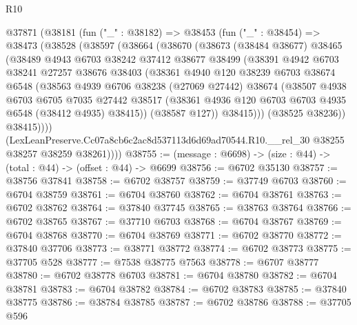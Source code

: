 \begin{lexlean}{R10}
\begin{coremodule}
  @37871
    (@38181
      (fun ("_" : @38182) =>
      @38453
        (fun ("_" : @38454) =>
        @38473
          (@38528
            (@38597
              (@38664
                (@38670
                  (@38673
                    (@38484 @38677)
                    @38465
                    (@38489
                      @4943
                      @6703
                      @38242
                      @37412
                      @38677
                      @38499
                      (@38391
                        @4942
                        @6703
                        @38241
                        @27257
                        @38676
                        @38403
                        (@38361
                          @4940
                          @120
                          @38239
                          @6703
                          @38674
                          @6548
                          (@38563
                            @4939
                            @6706
                            @38238
                            (@27069 @27442)
                            @38674
                            (@38507
                              @4938
                              @6703
                              @6705
                              @7035
                              @27442
                              @38517
                              (@38361 @4936 @120 @6703 @6703 @4935 @6548 (@38412 @4935) @38415))
                            (@38587 @127))
                          @38415)))
                    (@38525 @38236))
                  @38415))))
          (LexLeanPreserve.Cc07a8cb6c2ac8d537113d6d69ad70544.R10.__rel_30
            @38255
            @38257
            @38259
            @38261))))
@38755 := (message : @6698) -> (size : @44) -> (total : @44) -> (offset : @44) -> @6699
@38756 := @6702 @35130
@38757 := @38756 @37841
@38758 := @6702 @38757
@38759 := @37749 @6703
@38760 := @6704 @38759
@38761 := @6704 @38760
@38762 := @6704 @38761
@38763 := @6702 @38762
@38764 := @37840 @37745
@38765 := @38763 @38764
@38766 := @6702 @38765
@38767 := @37710 @6703
@38768 := @6704 @38767
@38769 := @6704 @38768
@38770 := @6704 @38769
@38771 := @6702 @38770
@38772 := @37840 @37706
@38773 := @38771 @38772
@38774 := @6702 @38773
@38775 := @37705 @528
@38777 := @7538 @38775 @7563
@38778 := @6707 @38777
@38780 := @6702 @38778 @6703
@38781 := @6704 @38780
@38782 := @6704 @38781
@38783 := @6704 @38782
@38784 := @6702 @38783
@38785 := @37840 @38775
@38786 := @38784 @38785
@38787 := @6702 @38786
@38788 := @37705 @596

\end{coremodule}
\end{lexlean}
